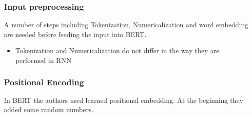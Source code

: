 \documentclass{article}
\begin{document}
\subsubsection*{Input preprocessing}
A number of steps including Tokenization, Numericalization and word embedding are needed before feeding the input into BERT.
\begin{itemize}
    \item Tokenization and Numericalization do not differ in the way they are performed in RNN
\end{itemize}
\subsubsection*{Positional Encoding}
In BERT the authors used learned positional embedding. At the beginning they added some random numbers. 


\end{document}

